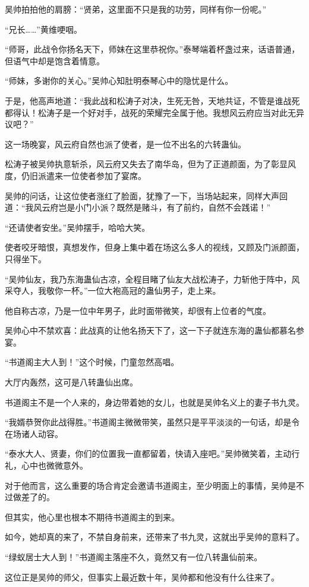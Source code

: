\begin{this_body}
吴帅拍拍他的肩膀：“贤弟，这里面不只是我的功劳，同样有你一份呢。”

“兄长……”黄维哽咽。

“师哥，此战令你扬名天下，师妹在这里恭祝你。”泰琴端着杯盏过来，话语普通，但语气中却是饱含着情意。

“师妹，多谢你的关心。”吴帅心知肚明泰琴心中的隐忧是什么。

于是，他高声地道：“我此战和松涛子对决，生死无咎，天地共证，不管是谁战死都得认！松涛子是一个好对手，战死的荣耀完全属于他。我想风云府应当对此无异议吧？”

这一场晚宴，风云府自然也派了使者，是一位不出名的六转蛊仙。

松涛子被吴帅执意斩杀，风云府又失去了南华岛，但为了正道颜面，为了彰显风度，仍旧派遣来一位使者参加了宴席。

吴帅的问话，让这位使者涨红了脸面，犹豫了一下，当场站起来，同样大声回道：“我风云府岂是小门小派？既然是赌斗，有了前约，自然不会践诺！”

“还请使者安坐。”吴帅摆手，哈哈大笑。

使者咬牙暗恨，真想发作，但身上集中着在场这么多人的视线，又顾及门派颜面，只得坐下。

“吴帅仙友，我乃东海蛊仙古凉，全程目睹了仙友大战松涛子，力斩他于阵中，风采夺人，我敬你一杯。”一位大袍高冠的蛊仙男子，走上来。

他自称古凉，乃是一位中年男子，此时面带微笑，却很有上位者的气度。

吴帅心中不禁欢喜：此战真的让他名扬天下了，这一下子就连东海的蛊仙都慕名参宴。

“书道阁主大人到！”这个时候，门童忽然高唱。

大厅内轰然，这可是八转蛊仙出席。

书道阁主不是一个人来的，身边带着她的女儿，也就是吴帅名义上的妻子书九灵。

“我婿恭贺你此战得胜。”书道阁主微微带笑，虽然只是平平淡淡的一句话，却是令在场诸人动容。

“泰水大人、贤妻，你们的位置我一直都留着，快请入座吧。”吴帅微笑着，主动行礼，心中也微微意外。

对于他而言，这么重要的场合肯定会邀请书道阁主，至少明面上的事情，吴帅是不过做差了的。

但其实，他心里也根本不期待书道阁主的到来。

如今，她却真的来了，不禁自身前来，还带来了书九灵，这就出乎吴帅的意料了。

“绿蚁居士大人到！”书道阁主落座不久，竟然又有一位八转蛊仙前来。

这位正是吴帅的师父，但事实上最近数十年，吴帅都和他没有什么往来了。


\end{this_body}
